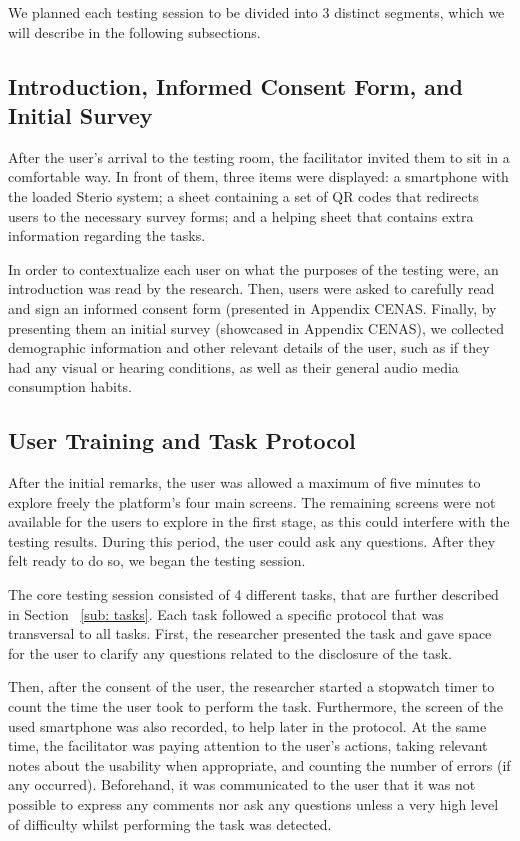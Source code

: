 We planned each testing session to be divided into 3 distinct segments, which we will describe in the following subsections.

\subsection{Introduction, Informed Consent Form, and Initial Survey}

After the user's arrival to the testing room, the facilitator invited them to sit in a comfortable way. In front of them, three items were displayed: a smartphone with the loaded Sterio system; a sheet containing a set of QR codes that redirects users to the necessary survey forms; and a helping sheet that contains extra information regarding the tasks.

In order to contextualize each user on what the purposes of the testing were, an introduction was read by the research. Then, users were asked to carefully read and sign an informed consent form (presented in Appendix CENAS. Finally, by presenting them an initial survey (showcased in Appendix CENAS), we collected demographic information and other relevant details of the user, such as if they had any visual or hearing conditions, as well as their general audio media consumption habits.

\subsection{User Training and Task Protocol}

After the initial remarks, the user was allowed a maximum of five minutes to explore freely the platform's four main screens. The remaining screens were not available for the users to explore in the first stage, as this could interfere with the testing results. During this period, the user could ask any questions. After they felt ready to do so, we began the testing session.

The core testing session consisted of 4 different tasks, that are further described in Section ~\ref{sub: tasks}. Each task followed a specific protocol that was transversal to all tasks. First, the researcher presented the task and gave space for the user to clarify any questions related to the disclosure of the task.

Then, after the consent of the user, the researcher started a stopwatch timer to count the time the user took to perform the task. Furthermore, the screen of the used smartphone was also recorded, to help later in the protocol. At the same time, the facilitator was paying attention to the user's actions, taking relevant notes about the usability when appropriate, and counting the number of errors (if any occurred). Beforehand, it was communicated to the user that it was not possible to express any comments nor ask any questions unless a very high level of difficulty whilst performing the task was detected.

